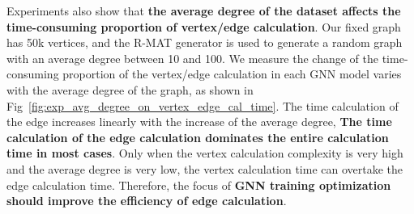 Experiments also show that \textbf{the average degree of the dataset affects the time-consuming proportion of vertex/edge calculation}. 
Our fixed graph has 50k vertices, and the R-MAT generator is used to generate a random graph with an average degree between 10 and 100.
We measure the change of the time-consuming proportion of the vertex/edge calculation in each GNN model varies with the average degree of the graph,
as shown in Fig~\ref{fig:exp_avg_degree_on_vertex_edge_cal_time}. The time calculation of the edge increases linearly with the increase of the average degree,
\textbf{The time calculation of the edge calculation dominates the entire calculation time in most cases}. 
Only when the vertex calculation complexity is very high and the average degree is very low, the vertex calculation time can overtake the edge calculation time.
Therefore, the focus of \textbf{GNN training optimization should improve the efficiency of edge calculation}.

